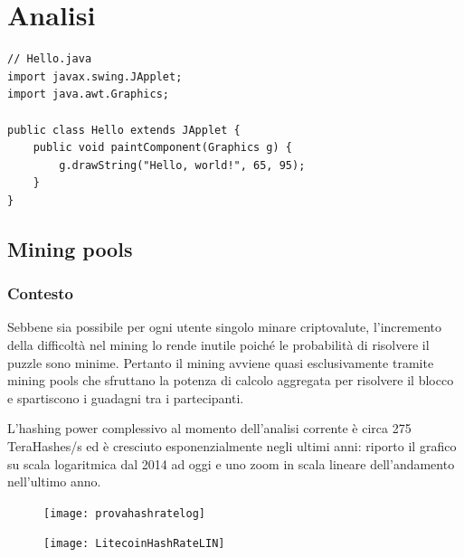 \chapter{Analisi}


\begin{lstlisting}
// Hello.java
import javax.swing.JApplet;
import java.awt.Graphics;

public class Hello extends JApplet {
	public void paintComponent(Graphics g) {
		g.drawString("Hello, world!", 65, 95);
	}    
}
\end{lstlisting}

\section{Mining pools}

\subsection{Contesto}
Sebbene sia possibile per ogni utente singolo minare criptovalute, l’incremento della difficoltà nel mining lo rende inutile poiché le probabilità di risolvere il puzzle sono minime. Pertanto il mining avviene quasi esclusivamente tramite mining pools che sfruttano la potenza di calcolo aggregata per risolvere il blocco e spartiscono i guadagni tra i partecipanti.


L’hashing power complessivo al momento dell’analisi corrente è circa 275 TeraHashes/s ed è cresciuto esponenzialmente negli ultimi anni: riporto il grafico su scala logaritmica dal 2014 ad oggi e uno zoom in scala lineare dell’andamento nell’ultimo anno.


\begin{figure}[h]
	\texttt{[image: provahashratelog]}
	\caption{}
	\label{fig:provahashratelog}
\end{figure}

\begin{figure}
	\centering
	\texttt{[image: LitecoinHashRateLIN]}
	\caption{}
	\label{fig:litecoinhashratelin}
\end{figure}




